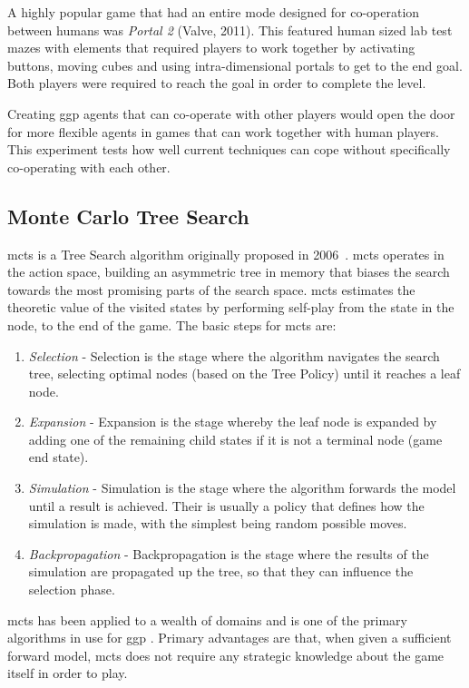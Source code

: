 \documentclass{IEEEtran}
\begin{document}
A highly popular game that had an entire mode designed for co-operation between humans was \textit{Portal 2} (Valve, 2011). This featured human sized lab test mazes with elements that required players to work together by activating buttons, moving cubes and using intra-dimensional portals to get to the end goal. Both players were required to reach the goal in order to complete the level.

Creating \gls{ggp} agents that can co-operate with other players would open the door for more flexible agents in games that can work together with human players. This experiment tests how well current techniques can cope without specifically co-operating with each other.

\subsection{Monte Carlo Tree Search}

\gls{mcts} is a Tree Search algorithm originally proposed in 2006~\cite{coulom2007efficient, kocsis2006bandit, kocsis2006improved}. \gls{mcts} operates in the action space, building an asymmetric tree in memory that biases the search towards the most promising parts of the search space. \gls{mcts} estimates the theoretic value of the visited states by performing self-play from the state in the node, to the end of the game. The basic steps for \gls{mcts} are:

\begin{enumerate}
\item{\emph{Selection} - Selection is the stage where the algorithm navigates the search tree, selecting optimal nodes (based on the Tree Policy) until it reaches a leaf node.}
\item{\emph{Expansion} - Expansion is the stage whereby the leaf node is expanded by adding one of the remaining child states if it is not a terminal node (game end state).}
\item{\emph{Simulation} - Simulation is the stage where the algorithm forwards the model until a result is achieved. Their is usually a policy that defines how the simulation is made, with the simplest being random possible moves.}
\item{\emph{Backpropagation} - Backpropagation is the stage where the results of the simulation are propagated up the tree, so that they can influence the selection phase.}
\end{enumerate}

\gls{mcts} \cite{browne2012survey} has been applied to a wealth of domains and is one of the primary algorithms in use for \gls{ggp} \cite{finnsson2008simulation}. Primary advantages are that, when given a sufficient forward model, \gls{mcts} does not require any strategic knowledge about the game itself in order to play.
\end{document}
